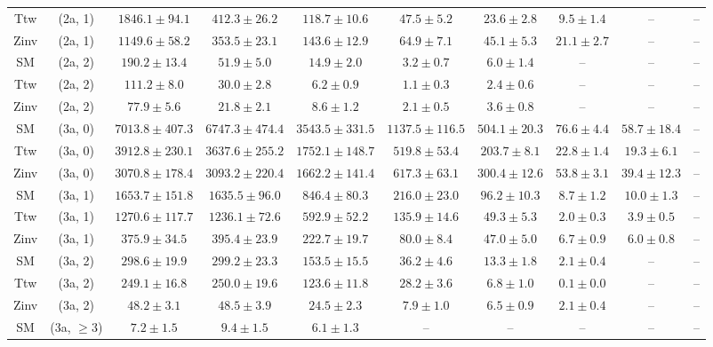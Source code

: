 \begin{table}[h!]
{\begin{tabular}{cccccccccc}
	Ttw & (2a, 1) & $1846.1\pm 94.1$ & $412.3\pm 26.2$ & $118.7\pm 10.6$ & $47.5\pm 5.2$ & $23.6\pm 2.8$ & $9.5\pm 1.4$ & -- & -- \\[0.5ex] 
	Zinv & (2a, 1) & $1149.6\pm 58.2$ & $353.5\pm 23.1$ & $143.6\pm 12.9$ & $64.9\pm 7.1$ & $45.1\pm 5.3$ & $21.1\pm 2.7$ & -- & -- \\[0.5ex] 
	SM & (2a, 2) & $190.2\pm 13.4$ & $51.9\pm 5.0$ & $14.9\pm 2.0$ & $3.2\pm 0.7$ & $6.0\pm 1.4$ & -- & -- & -- \\[0.5ex] 
	Ttw & (2a, 2) & $111.2\pm 8.0$ & $30.0\pm 2.8$ & $6.2\pm 0.9$ & $1.1\pm 0.3$ & $2.4\pm 0.6$ & -- & -- & -- \\[0.5ex] 
	Zinv & (2a, 2) & $77.9\pm 5.6$ & $21.8\pm 2.1$ & $8.6\pm 1.2$ & $2.1\pm 0.5$ & $3.6\pm 0.8$ & -- & -- & -- \\[0.5ex] 
	SM & (3a, 0) & $7013.8\pm 407.3$ & $6747.3\pm 474.4$ & $3543.5\pm 331.5$ & $1137.5\pm 116.5$ & $504.1\pm 20.3$ & $76.6\pm 4.4$ & $58.7\pm 18.4$ & -- \\[0.5ex] 
	Ttw & (3a, 0) & $3912.8\pm 230.1$ & $3637.6\pm 255.2$ & $1752.1\pm 148.7$ & $519.8\pm 53.4$ & $203.7\pm 8.1$ & $22.8\pm 1.4$ & $19.3\pm 6.1$ & -- \\[0.5ex] 
	Zinv & (3a, 0) & $3070.8\pm 178.4$ & $3093.2\pm 220.4$ & $1662.2\pm 141.4$ & $617.3\pm 63.1$ & $300.4\pm 12.6$ & $53.8\pm 3.1$ & $39.4\pm 12.3$ & -- \\[0.5ex] 
	SM & (3a, 1) & $1653.7\pm 151.8$ & $1635.5\pm 96.0$ & $846.4\pm 80.3$ & $216.0\pm 23.0$ & $96.2\pm 10.3$ & $8.7\pm 1.2$ & $10.0\pm 1.3$ & -- \\[0.5ex] 
	Ttw & (3a, 1) & $1270.6\pm 117.7$ & $1236.1\pm 72.6$ & $592.9\pm 52.2$ & $135.9\pm 14.6$ & $49.3\pm 5.3$ & $2.0\pm 0.3$ & $3.9\pm 0.5$ & -- \\[0.5ex] 
	Zinv & (3a, 1) & $375.9\pm 34.5$ & $395.4\pm 23.9$ & $222.7\pm 19.7$ & $80.0\pm 8.4$ & $47.0\pm 5.0$ & $6.7\pm 0.9$ & $6.0\pm 0.8$ & -- \\[0.5ex] 
	SM & (3a, 2) & $298.6\pm 19.9$ & $299.2\pm 23.3$ & $153.5\pm 15.5$ & $36.2\pm 4.6$ & $13.3\pm 1.8$ & $2.1\pm 0.4$ & -- & -- \\[0.5ex] 
	Ttw & (3a, 2) & $249.1\pm 16.8$ & $250.0\pm 19.6$ & $123.6\pm 11.8$ & $28.2\pm 3.6$ & $6.8\pm 1.0$ & $0.1\pm 0.0$ & -- & -- \\[0.5ex] 
	Zinv & (3a, 2) & $48.2\pm 3.1$ & $48.5\pm 3.9$ & $24.5\pm 2.3$ & $7.9\pm 1.0$ & $6.5\pm 0.9$ & $2.1\pm 0.4$ & -- & -- \\[0.5ex] 
	SM & (3a, $\ge3$) & $7.2\pm 1.5$ & $9.4\pm 1.5$ & $6.1\pm 1.3$ & -- & -- & -- & -- & -- \\[0.5ex] 

\end{tabular}}
\end{table}
